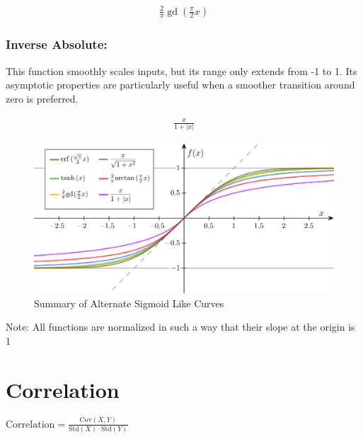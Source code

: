 \documentclass[
  12 pt,
  a4paper,
]{book}
\numberwithin{equation}{section}
\theoremstyle{plain}      %
\theoremstyle{definition} %
\theoremstyle{remark}     %
\theoremstyle{note}         %
\begin{document}
\begin{align}
\frac{2}{\pi} \operatorname{gd}\left(\frac{\pi}{2} x\right)
\end{align}

\hypertarget{inverse-absolute}{%
\subsection{Inverse Absolute:}\label{inverse-absolute}}

This function smoothly scales inputs, but its range only extends from -1
to 1. Its asymptotic properties are particularly useful when a smoother
transition around zero is preferred.

\begin{align}
\frac{x}{1+|x|}
\end{align}

\newpage

\begin{figure}[H]
    \centering
    \begin{minipage}[t]{1.0\textwidth}
        \centering
        \includegraphics[width=\textwidth]{pictures/Sigmoids_comparisons.jpeg}
        \caption{Summary of Alternate Sigmoid Like Curves}
    \end{minipage}
    \label{fig:sigmoid-layout}
\end{figure}

Note: All functions are normalized in such a way that their slope at the
origin is 1

\newpage

\hypertarget{correlation}{%
\chapter{Correlation}\label{correlation}}

\begin{center}
\colorbox{white}{\color{navyimpactblue} \huge $\text{Correlation} = \frac{\text{Cov}(X, Y)}{\text{Std}(X) \cdot \text{Std}(Y)}$}
\end{center}
\end{document}
